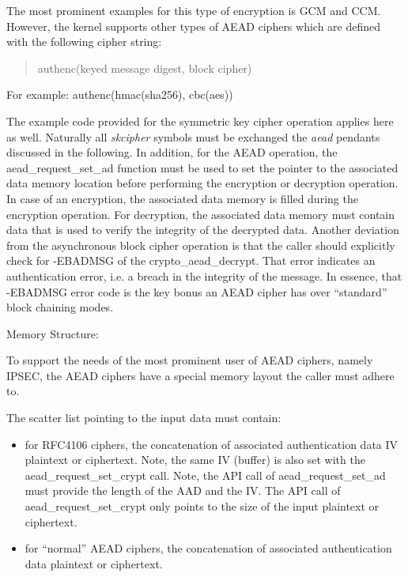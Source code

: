 \documentclass[a4paper,8pt,english]{sphinxmanual}
\begin{document}
The most prominent examples for this type of encryption is GCM and CCM.
However, the kernel supports other types of AEAD ciphers which are defined
with the following cipher string:
\begin{quote}

authenc(keyed message digest, block cipher)
\end{quote}

For example: authenc(hmac(sha256), cbc(aes))

The example code provided for the symmetric key cipher operation
applies here as well. Naturally all \emph{skcipher} symbols must be exchanged
the \emph{aead} pendants discussed in the following. In addition, for the AEAD
operation, the aead\_request\_set\_ad function must be used to set the
pointer to the associated data memory location before performing the
encryption or decryption operation. In case of an encryption, the associated
data memory is filled during the encryption operation. For decryption, the
associated data memory must contain data that is used to verify the integrity
of the decrypted data. Another deviation from the asynchronous block cipher
operation is that the caller should explicitly check for -EBADMSG of the
crypto\_aead\_decrypt. That error indicates an authentication error, i.e.
a breach in the integrity of the message. In essence, that -EBADMSG error
code is the key bonus an AEAD cipher has over ``standard'' block chaining
modes.

Memory Structure:

To support the needs of the most prominent user of AEAD ciphers, namely
IPSEC, the AEAD ciphers have a special memory layout the caller must adhere
to.

The scatter list pointing to the input data must contain:
\begin{itemize}
\item {} 
for RFC4106 ciphers, the concatenation of
associated authentication data \textbar{}\textbar{} IV \textbar{}\textbar{} plaintext or ciphertext. Note, the
same IV (buffer) is also set with the aead\_request\_set\_crypt call. Note,
the API call of aead\_request\_set\_ad must provide the length of the AAD and
the IV. The API call of aead\_request\_set\_crypt only points to the size of
the input plaintext or ciphertext.

\item {} 
for ``normal'' AEAD ciphers, the concatenation of
associated authentication data \textbar{}\textbar{} plaintext or ciphertext.

\end{itemize}
\end{document}
